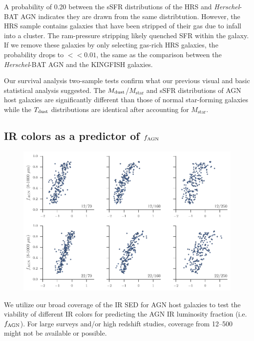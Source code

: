 \documentclass[fleqn, usenatbib]{mnras}
\newcommand{\herschel}{\emph{Herschel}}
\newcommand{\mstar}{$M_{\mathrm{star}}$}
\newcommand{\mdust}{$M_{\rm dust}$}
\newcommand{\tdust}{$T_{\rm dust}$}
\begin{document}
A probability of 0.20 between the sSFR distributions of the HRS and \herschel-BAT AGN indicates they are drawn from the same distribtution. However, the HRS sample contains galaxies that have been stripped of their gas due to infall into a cluster. The ram-pressure stripping likely quenched SFR within the galaxy. If we remove these galaxies by only selecting gas-rich HRS galaxies, the probability drops to $<<0.01$, the same as the comparison between the \herschel-BAT AGN and the KINGFISH galaxies.

Our survival analysis two-sample tests confirm what our previous visual and basic statistical analysis suggested. The \mdust/\mstar{} and sSFR distributions of AGN host galaxies are significantly different than those of normal star-forming galaxies while the \tdust{} distributions are identical after accounting for \mstar. 

\subsection{IR colors as a predictor of $f_{\rm AGN}$}

\begin{figure}
\includegraphics[width=\textwidth]{figures/agnfrac_vs_flux_ratio}
\caption{\label{fig:agnfrac_vs_flux_ratio}}
\end{figure}

We utilize our broad coverage of the IR SED for AGN host galaxies to test the viability of different IR colors for predicting the AGN IR luminosity fraction (i.e. $f_{\rm AGN}$). For large surveys and/or high redshift studies, coverage from 12--500 \micron{} might not be available or possible.
\end{document}
